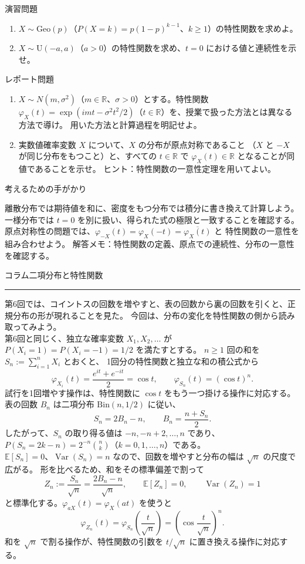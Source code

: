 \documentclass[a4paper,10pt,pdflatex,ja=standard,jafont=ipaex-type1,
  magstyle=real,scale=1]{bxjsarticle}
\newcommand{\coursename}{確率論と統計学 I}
\newcommand{\topic}[1]{\par\vspace{5pt}
  {\large\sffamily\mdseries\color{accent}#1}\par\vspace{2pt}}
\newcommand{\handouttitle}[1]{%
  \begin{center}
    {\Large\color{ink}#1}\par\vspace{3mm}
    {\color{accent}\rule{0.88\linewidth}{0.7pt}}
  \end{center}\vspace{-2mm}}
\newcommand{\columnstart}[1]{\clearpage
  \setlength{\parskip}{2.5pt}
  \fancyhead[L]{\small\color{ink}\coursename{}・コラム}
  \handouttitle{コラム\quad #1}}
\newcommand{\R}{\mathbb R}
\newcommand{\E}{\mathbb E}
\newcommand{\Var}{\operatorname{Var}}
\begin{document}
\newpage
\topic{演習問題}
\begin{enumerate}[label=\arabic*.]
\item $X\sim\mathrm{Geo}(p)$（$P(X=k)=p(1-p)^{k-1}$、$k\ge1$）の特性関数を求めよ。
\item $X\sim\mathrm U(-a,a)$（$a>0$）の特性関数を求め、$t=0$ における値と連続性を示せ。
\end{enumerate}

\topic{レポート問題}
\begin{enumerate}[label=\arabic*.]
\item $X\sim N(m,\sigma^2)$（$m\in\R$、$\sigma>0$）とする。特性関数
$\varphi_X(t)=\exp(imt-\sigma^2t^2/2)$（$t\in\R$）を、授業で扱った方法とは異なる方法で導け。
用いた方法と計算過程を明記せよ。
\item 実数値確率変数 $X$ について、$X$ の分布が原点対称であること
（$X$ と $-X$ が同じ分布をもつこと）と、すべての $t\in\R$ で
$\varphi_X(t)\in\R$ となることが同値であることを示せ。
ヒント：特性関数の一意性定理を用いてよい。
\end{enumerate}

\topic{考えるための手がかり}
離散分布では期待値を和に、密度をもつ分布では積分に書き換えて計算しよう。
一様分布では $t=0$ を別に扱い、得られた式の極限と一致することを確認する。
原点対称性の問題では、$\varphi_{-X}(t)=\varphi_X(-t)=\overline{\varphi_X(t)}$ と
特性関数の一意性を組み合わせよう。
\vfill
{\small\color{muted}解答メモ：特性関数の定義、原点での連続性、分布の一意性を確認する。}

\columnstart{二項分布と特性関数}
第6回では、コイントスの回数を増やすと、表の回数から裏の回数を引くと、正規分布の形が現れることを見た。
今回は、分布の変化を特性関数の側から読み取ってみよう。\\

第6回と同じく、独立な確率変数 $X_1,X_2,\ldots$ が
$P(X_i=1)=P(X_i=-1)=1/2$ を満たすとする。
$n\ge1$ 回の和を $S_n:=\sum_{i=1}^nX_i$ とおくと、
1回分の特性関数と独立な和の積公式から
$$\varphi_{X_i}(t)=\frac{e^{it}+e^{-it}}2=\cos t,\qquad
 \varphi_{S_n}(t)=(\cos t)^n.$$
試行を1回増やす操作は、特性関数に $\cos t$ をもう一つ掛ける操作に対応する。
表の回数 $B_n$ は二項分布 $\mathrm{Bin}(n,1/2)$ に従い、
$$S_n=2B_n-n,\qquad B_n=\frac{n+S_n}{2}.$$
したがって、$S_n$ の取り得る値は $-n,-n+2,\ldots,n$ であり、
$P(S_n=2k-n)=2^{-n}\binom nk$（$k=0,1,\ldots,n$）である。\\

$\E[S_n]=0$、$\Var(S_n)=n$ なので、回数を増やすと分布の幅は $\sqrt n$ の尺度で広がる。
形を比べるため、和をその標準偏差で割って
$$Z_n:=\frac{S_n}{\sqrt n}=\frac{2B_n-n}{\sqrt n},\qquad
 \E[Z_n]=0,\qquad \Var(Z_n)=1$$
と標準化する。$\varphi_{aX}(t)=\varphi_X(at)$ を使うと
$$\varphi_{Z_n}(t)
 =\varphi_{S_n}\left(\frac{t}{\sqrt n}\right)
 =\left(\cos\frac{t}{\sqrt n}\right)^n.$$
和を $\sqrt n$ で割る操作が、特性関数の引数を $t/\sqrt n$ に置き換える操作に対応する。
\end{document}

